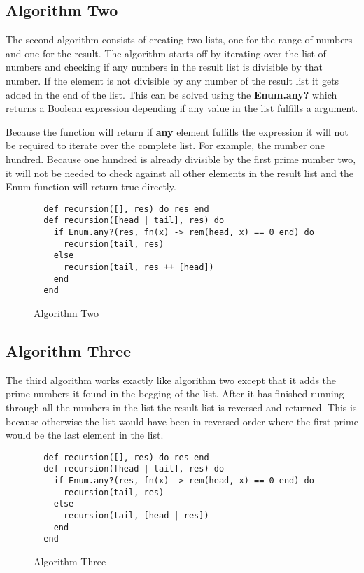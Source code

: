 \documentclass[a4paper,11pt]{article}
\begin{document}
\subsection*{Algorithm Two}
The second algorithm consists of creating two lists, one for the range of numbers and one for the result. The algorithm starts off by iterating over the list of numbers and checking if any numbers in the result list is divisible by that number. If the element is not divisible by any number of the result list it gets added in the end of the list. This can be solved using the \textbf{Enum.any?} which returns a Boolean expression depending if any value in the list fulfills a argument.

Because the function will return if \textbf{any} element fulfills the expression it will not be required to iterate over the complete list. For example, the number one hundred. Because one hundred is already divisible by the first prime number two, it will not be needed to check against all other elements in the result list and the Enum function will return true directly.

\begin{figure}[H]
\begin{verbatim}
  def recursion([], res) do res end
  def recursion([head | tail], res) do
    if Enum.any?(res, fn(x) -> rem(head, x) == 0 end) do
      recursion(tail, res)
    else
      recursion(tail, res ++ [head])
    end
  end
\end{verbatim}
\caption{Algorithm Two}
\label{Figure:2}
\end{figure}

\subsection*{Algorithm Three}
The third algorithm works exactly like algorithm two except that it adds the prime numbers it found in the begging of the list. After it has finished running through all the numbers in the list the result list is reversed and returned. This is because otherwise the list would have been in reversed order where the first prime would be the last element in the list.

\begin{figure}[H]
\begin{verbatim}
  def recursion([], res) do res end
  def recursion([head | tail], res) do
    if Enum.any?(res, fn(x) -> rem(head, x) == 0 end) do
      recursion(tail, res)
    else
      recursion(tail, [head | res])
    end
  end
\end{verbatim}
\caption{Algorithm Three}
\label{Figure:3}
\end{figure}
\end{document}
